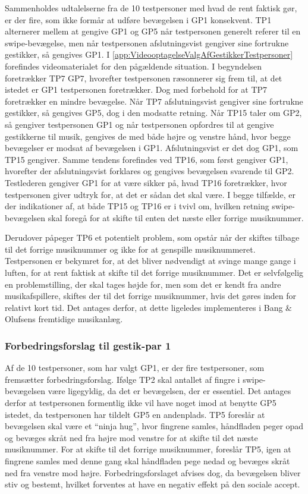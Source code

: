 Sammenholdes udtalelserne fra de 10 testpersoner med hvad de rent faktisk gør, er der fire, som ikke formår at udføre bevægelsen i GP1 konsekvent. TP1 alternerer mellem at gengive GP1 og GP5 når testpersonen generelt referer til en swipe-bevægelse, men når testpersonen afslutningsvist gengiver sine fortrukne gestikker, så gengives GP1. I \autoref{app:VideooptagelseValgAfGestikkerTestpersoner} forefindes videomaterialet for den pågældende situation. I begyndelsen foretrækker TP7 GP7, hvorefter testpersonen ræsonnerer sig frem til, at det istedet er GP1 testpersonen foretrækker. Dog med forbehold for at TP7 foretrækker en mindre bevægelse. Når TP7 afslutningsvist gengiver sine fortrukne gestikker, så gengives GP5, dog i den modsatte retning. Når TP15 taler om GP2, så gengiver testpersonen GP1 og når testpersonen opfordres til at gengive gestikkerne til musik, gengives de med både højre og venstre hånd, hvor begge bevægelser er modsat af bevægelsen i GP1. Afslutningsvist er det dog GP1, som TP15 gengiver. Samme tendens forefindes ved TP16, som først gengiver GP1, hvorefter der afslutningsvist forklares og gengives bevægelsen svarende til GP2. Testlederen gengiver GP1 for at være sikker på, hvad TP16 foretrækker, hvor testpersonen giver udtryk for, at det er sådan det skal være. I begge tilfælde, er der indikationer af, at både TP15 og TP16 er i tvivl om, hvilken retning swipe-bevægelsen skal foregå for at skifte til enten det næste eller forrige musiknummer.

Derudover påpeger TP6 et potentielt problem, som opstår når der skiftes tilbage til det forrige musiknummer og ikke for at genspille musiknummeret. Testpersonen er bekymret for, at det bliver nødvendigt at svinge mange gange i luften, for at rent faktisk at skifte til det forrige musiknummer. Det er selvfølgelig en problemstilling, der skal tages højde for, men som det er kendt fra andre musikafspillere, skiftes der til det forrige musiknummer, hvis det gøres inden for relativt kort tid. Det antages derfor, at dette ligeledes implementeres i Bang $\&$ Olufsens fremtidige musikanlæg. 
%
\subsubsection{Forbedringsforslag til gestik-par 1}
\label{TestresultaterValgAfGestikkerForbedringGP1Skift}
%
Af de 10 testpersoner, som har valgt GP1, er der fire testpersoner, som fremsætter forbedringsforslag. Ifølge TP2 skal antallet af fingre i swipe-bevægelsen være ligegyldig, da det er bevægelsen, der er essentiel. Det antages derfor at testpersonen formentlig ikke vil have noget imod at benytte GP5 istedet, da testpersonen har tildelt GP5 en andenplads. TP5 foreslår at bevægelsen skal være et \enquote{ninja hug}, hvor fingrene samles, håndfladen peger opad og bevæges skråt ned fra højre mod venstre for at skifte til det næste musiknummer. For at skifte til det forrige musiknummer, foreslår TP5, igen at fingrene samles med denne gang skal håndfladen pege nedad og bevæges skråt ned fra venstre mod højre. Forbedringsforslaget afvises dog, da bevægelsen bliver stiv og bestemt, hvilket forventes at have en negativ effekt på den sociale accept.

